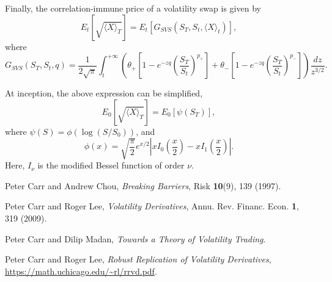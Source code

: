 \documentclass[12pt]{article}
\begin{document}
      Finally, the correlation-immune price of a volatility swap is given by
      \begin{equation}
        E_t\left[\sqrt{\langle X \rangle_T}\right] = E_t\left[G_{SVS}\left(S_T,S_t,\langle X \rangle_t\right)\right],
      \end{equation}
      where
      \begin{equation}
        G_{SVS}\left(S_T,S_t,q\right) = \frac{1}{2\sqrt{\pi}}\int_t^{+\infty}\left(\theta_+\left[1-e^{-zq}\left(\frac{S_T}{S_t}\right)^{p_+}\right]
                                                                                + \theta_-\left[1-e^{-zq}\left(\frac{S_T}{S_t}\right)^{p_-}\right]\right)\frac{dz}{z^{3/2}}.
      \end{equation}

      At inception, the above expression can be simplified,
      \begin{equation}
        E_0\left[\sqrt{\langle X \rangle_T}\right] = E_0\left[\psi(S_T)\right],
      \end{equation}
      where $\psi(S)=\phi(\log(S/S_0))$, and
      \begin{equation}
        \phi(x)=\sqrt{\frac{\pi}{2}}e^{x/2}\left|xI_0\left(\frac{x}{2}\right)-xI_1\left(\frac{x}{2}\right)\right|.
      \end{equation}
      Here, $I_{\nu}$ is the modified Bessel function of order $\nu$.


\begin{thebibliography}{99}
    Peter Carr and Andrew Chou, {\it Breaking Barriers}, Risk {\bf 10}(9), 139 (1997).

    Peter Carr and Roger Lee, {\it Volatility Derivatives}, Annu. Rev. Financ. Econ. {\bf 1}, 319 (2009).

    Peter Carr and Dilip Madan, {\it Towards a Theory of Volatility Trading}.

    Peter Carr and Roger Lee, {\it Robust Replication of Volatility Derivatives}, \url{https://math.uchicago.edu/~rl/rrvd.pdf}.

\end{thebibliography}
\end{document}
